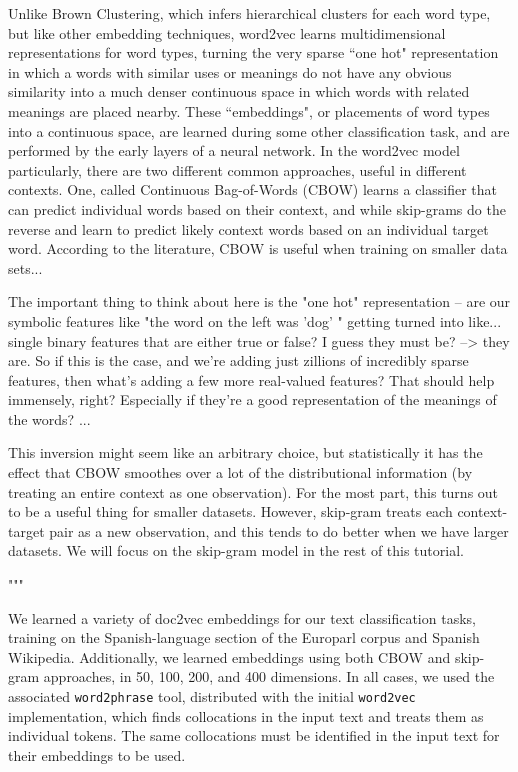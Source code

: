Unlike Brown Clustering, which infers hierarchical clusters for each word type,
but like other embedding techniques, word2vec learns multidimensional
representations for word types, turning the very sparse ``one hot"
representation in which a words with similar uses or meanings do not have any
obvious similarity into a much denser continuous space in which words with
related meanings are placed nearby. These ``embeddings", or placements of word
types into a continuous space, are learned during some other classification
task, and are performed by the early layers of a neural network. In the
word2vec model particularly, there are two different common approaches, useful
in different contexts. One, called Continuous Bag-of-Words (CBOW) learns a
classifier that can predict individual words based on their context, and while
skip-grams do the reverse and learn to predict likely context words based on an
individual target word. According to the literature, CBOW is useful when
training on smaller data sets...


The important thing to think about here is the "one hot" representation -- are
our symbolic features like "the word on the left was 'dog' " getting turned into
like... single binary features that are either true or false? I guess they must
be?  --> they are. So if this is the case, and we're adding just zillions of
incredibly sparse features, then what's adding a few more real-valued features?
That should help immensely, right? Especially if they're a good representation
of the meanings of the words? ...

This inversion might seem like an
arbitrary choice, but statistically it has the effect that CBOW
smoothes over a lot of the distributional information (by treating an
entire context as one observation). For the most part, this turns out
to be a useful thing for smaller datasets. However, skip-gram treats
each context-target pair as a new observation, and this tends to do
better when we have larger datasets. We will focus on the skip-gram
model in the rest of this tutorial.

"""

We learned a variety of doc2vec embeddings for our text classification tasks,
training on the Spanish-language section of the Europarl corpus and Spanish
Wikipedia. Additionally, we learned embeddings using both CBOW and skip-gram
approaches, in 50, 100, 200, and 400 dimensions. In all cases, we used the
associated \texttt{word2phrase} tool, distributed with the initial
\texttt{word2vec} implementation, which finds collocations in the input text
and treats them as individual tokens. The same collocations must be identified
in the input text for their embeddings to be used.

